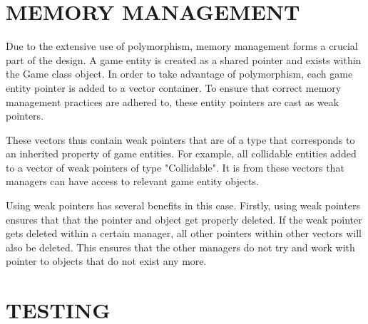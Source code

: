 \documentclass[10pt,twocolumn]{witseiepaper}
\begin{document}



%

%
\section{MEMORY MANAGEMENT} %

Due to the extensive use of polymorphism, memory management forms a crucial part of the design. A game entity is created as a shared pointer and exists within the Game class object. In order to take advantage of polymorphism, each game entity pointer is added to a vector container. To ensure that correct memory management practices are adhered to, these entity pointers are cast as weak pointers. 

These vectors thus contain weak pointers that are of a type that corresponds to an inherited property of game entities. For example, all collidable entities added to a vector of weak pointers of type "Collidable". It is from these vectors that managers can have access to relevant game entity objects.

Using weak pointers has several benefits in this case. Firstly, using weak pointers ensures that that the pointer and object get properly deleted. If the weak pointer gets deleted within a certain manager, all other pointers within other vectors will also be deleted. This ensures that the other managers do not try and work with pointer to objects that do not exist any more.




%
\section{TESTING} %
\end{document}
